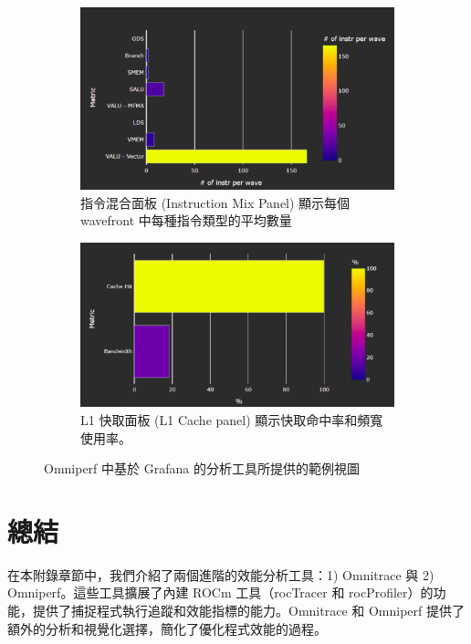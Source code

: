 \begin{figure}
    \centering
    \begin{subfigure}[b]{\textwidth}
        \centering
        \includegraphics[width=0.5\linewidth]{Appendici/InstructionMixPanel.png}
        \caption{指令混合面板 (Instruction Mix Panel) 顯示每個 wavefront 中每種指令類型的平均數量}
        \label{fig:instruction-mix-panel}
    \end{subfigure}

    \begin{subfigure}[b]{\textwidth}
        \centering
        \includegraphics[width=0.5\linewidth]{Appendici/L1CachePanel.png}
        \caption{L1 快取面板 (L1 Cache panel) 顯示快取命中率和頻寬使用率。}
        \label{fig:l1-cache-panel}
    \end{subfigure}

    \caption{Omniperf 中基於 Grafana 的分析工具所提供的範例視圖}
    
\end{figure}

\section{總結}
在本附錄章節中，我們介紹了兩個進階的效能分析工具：1) Omnitrace 與 2) Omniperf。這些工具擴展了內建 ROCm 工具（rocTracer 和 rocProfiler）的功能，提供了捕捉程式執行追蹤和效能指標的能力。Omnitrace 和 Omniperf 提供了額外的分析和視覺化選擇，簡化了優化程式效能的過程。

